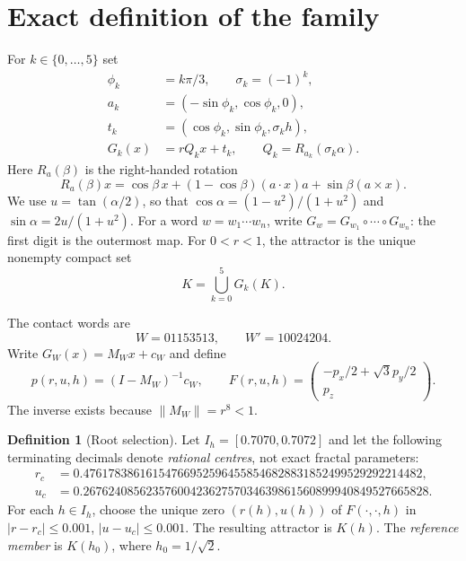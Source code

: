 \documentclass[11pt,a4paper]{article}
\theoremstyle{definition}\newtheorem{definition}[theorem]{Definition}
\theoremstyle{remark}\newtheorem{remark}[theorem]{Remark}
\begin{document}
\section{Exact definition of the family}\label{sec:def}
For $k\in\{0,\ldots,5\}$ set
\begin{equation}\label{eq:maps}
\begin{split}
\phi_k&=k\pi/3,\qquad \sigma_k=(-1)^k,\\
a_k&=(-\sin\phi_k,\cos\phi_k,0),\\
t_k&=(\cos\phi_k,\sin\phi_k,\sigma_k h),\\
G_k(x)&=rQ_kx+t_k,\qquad Q_k=R_{a_k}(\sigma_k\alpha).
\end{split}
\end{equation}
Here $R_a(\beta)$ is the right-handed rotation
\[
R_a(\beta)x=\cos\beta\,x+(1-\cos\beta)(a\cdot x)a+\sin\beta(a\times x).
\]
We use $u=\tan(\alpha/2)$, so that
$\cos\alpha=(1-u^2)/(1+u^2)$ and $\sin\alpha=2u/(1+u^2)$.
For a word $w=w_1\cdots w_n$, write
$G_w=G_{w_1}\circ\cdots\circ G_{w_n}$: the first digit is the outermost map.
For $0<r<1$, the attractor is the unique nonempty compact set
\begin{equation}\label{eq:attractor}
K=\bigcup_{k=0}^5G_k(K).
\end{equation}

The contact words are
\[
W=01153513,\qquad W'=10024204.
\]
Write $G_W(x)=M_Wx+c_W$ and define
\begin{equation}\label{eq:contact}
p(r,u,h)=(I-M_W)^{-1}c_W,\qquad
F(r,u,h)=\begin{pmatrix}-p_x/2+\sqrt3p_y/2\\p_z\end{pmatrix}.
\end{equation}
The inverse exists because $\|M_W\|=r^8<1$.

\begin{definition}[Root selection]\label{def:root}
Let $I_h=[0.7070,0.7072]$ and let the following terminating decimals denote
\emph{rational centres}, not exact fractal parameters:
\begin{align*}
r_c&=0.476178386161547669525964558546828831852499529292214482,\\
u_c&=0.2676240856235760042362757034639861560899940849527665828.
\end{align*}
For each $h\in I_h$, choose the unique zero $(r(h),u(h))$ of $F(\cdot,\cdot,h)$
in $|r-r_c|\le0.001$, $|u-u_c|\le0.001$. The resulting attractor is $K(h)$.
The \emph{reference member} is $K(h_0)$, where $h_0=1/\sqrt2$.
\end{definition}
\end{document}
